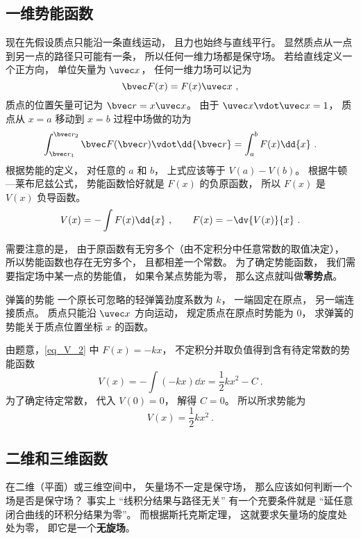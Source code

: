 \subsection{一维势能函数}

现在先假设质点只能沿一条直线运动， 且力也始终与直线平行。 显然质点从一点到另一点的路径只可能有一条， 所以任何一维力场都是保守场。 若给直线定义一个正方向， 单位矢量为 $\uvec x$， 任何一维力场可以记为
\begin{equation}\label{eq_V_2}
\bvec F(x) = F(x) \uvec x~,
\end{equation}
质点的位置矢量可记为 $\bvec r = x \uvec x$。 由于 $\uvec x \vdot \uvec x = 1$， 质点从 $x = a$ 移动到 $x=b$ 过程中场做的功为
\begin{equation}
\int_{\bvec r_1}^{\bvec r_2} \bvec F(\bvec r) \vdot \dd{\bvec r}
= \int_a^b F(x) \dd{x}~.
\end{equation}
根据势能的定义， 对任意的 $a$ 和 $b$， 上式应该等于 $V(a) - V(b)$。 根据牛顿—莱布尼兹公式， 势能函数恰好就是 $F(x)$ 的负原函数， 所以 $F(x)$ 是 $V(x)$ 负导函数。
\begin{equation}\label{eq_V_8}
V(x) = -\int F(x) \dd{x}~,
\qquad
F(x) = -\dv{V(x)}{x}~.
\end{equation}

需要注意的是， 由于原函数有无穷多个（由不定积分中任意常数的取值决定）， 所以势能函数也存在无穷多个， 且都相差一个常数。 为了确定势能函数， 我们需要指定场中某一点的势能值， 如果令某点势能为零， 那么这点就叫做\textbf{零势点}。

\begin{example}{弹簧的势能}
一个原长可忽略的轻弹簧劲度系数为 $k$， 一端固定在原点， 另一端连接质点。 质点只能沿 $\uvec x$ 方向运动， 规定质点在原点时势能为 $0$， 求弹簧的势能关于质点位置坐标 $x$ 的函数。 

由题意，\autoref{eq_V_2} 中 $F(x) = -kx$， 不定积分并取负值得到含有待定常数的势能函数
\begin{equation}
V(x) = -\int (-kx) \dd{x} = \frac12 k x^2 - C~.
\end{equation}
为了确定待定常数， 代入 $V(0) = 0$， 解得 $C = 0$。 所以所求势能为
\begin{equation}
V(x) =  \frac12 k x^2~.
\end{equation}
\end{example}

\subsection{二维和三维函数}
在二维（平面）或三维空间中， 矢量场不一定是保守场， 那么应该如何判断一个场是否是保守场？ 事实上 “线积分结果与路径无关” 有一个充要条件就是 “延任意闭合曲线的环积分结果为零”。 而根据斯托克斯定理， 这就要求矢量场的旋度处处为零， 即它是一个\textbf{无旋场}。

